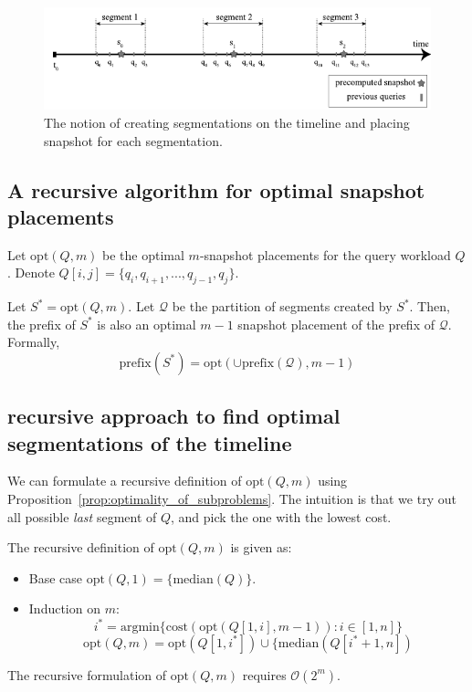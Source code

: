 		\begin{figure}
			\centering
			\includegraphics[width=\textwidth]{figs/segmentations.pdf}
			\caption{The notion of creating segmentations on the timeline and placing snapshot for each segmentation.}
			\label{fig:segmentation}
		\end{figure}

		\subsection{A recursive algorithm for optimal snapshot placements} \label{sec:recursive_algorithm}

			Let $\mathrm{opt}(Q, m)$ be the optimal $m$-snapshot placements for the query workload $Q$. Denote $Q[i,j] = \{q_i,q_{i+1},...,q_{j-1},q_j\}$.

			\begin{prop}
				Let $S^* = \mathrm{opt}(Q, m)$.  Let $\mathcal{Q}$ be the partition of segments created by $S^*$.  Then, the prefix of $S^*$ is also an optimal $m-1$ snapshot placement of the prefix of $\mathcal{Q}$. Formally, $$\mathrm{prefix}(S^*) = \mathrm{opt}(\cup\mathrm{prefix}(\mathcal{Q}), m-1)$$
			\label{prop:optimality_of_subproblems}
			\end{prop}

		\subsection{recursive approach to find optimal segmentations of the timeline} \label{sec:optimal_recursive_segmentation}
			We can formulate a recursive definition of $\mathrm{opt}(Q, m)$ using Proposition~\ref{prop:optimality_of_subproblems}. The intuition is that we try out all possible {\em last} segment of $Q$, and pick the one with the lowest cost.

			The recursive definition of $\mathrm{opt}(Q, m)$ is given as:

			\begin{itemize}
				\item Base case $ \mathrm{opt}(Q, 1) = \{\mathrm{median}(Q)\}$.
				\item Induction on $m$:
				$$i^* = \mathrm{argmin}\{\mathrm{cost}(\mathrm{opt}(Q[1,i], m-1)): i\in[1,
				n]\}$$
				$$
				\mathrm{opt}(Q, m) = \mathrm{opt}(Q[1, i^*]) \cup \{\mathrm{median}(Q[i^*+1, n])
				$$
			\end{itemize}
			The recursive formulation of $\mathrm{opt}(Q, m)$ requires $\mathcal{O}(2^{m})$.

